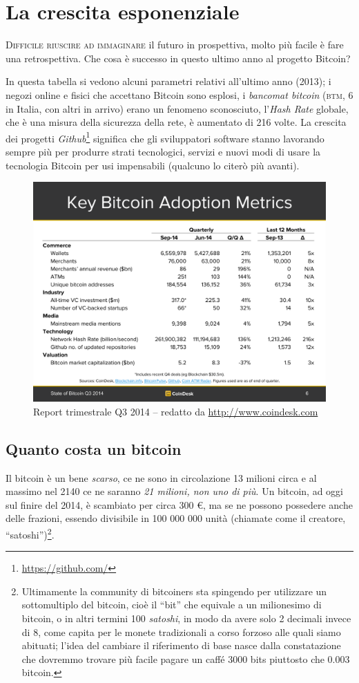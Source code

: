 \documentclass[a4paper,12pt,italian]{article}
\begin{document}
\section*{La crescita esponenziale}


\lettrine[lines=2]{D}{ifficile riuscire ad immaginare} il futuro in prospettiva, molto più
facile è fare una retrospettiva. Che cosa è successo in questo ultimo
anno al progetto Bitcoin?

In questa tabella 
si vedono alcuni parametri relativi all'ultimo anno (2013); i negozi online e fisici
che accettano Bitcoin sono esplosi, i \emph{bancomat bitcoin} (\textsc{btm}, 6 in
Italia, con altri in arrivo) erano un fenomeno sconosciuto, l’\emph{Hash Rate}
globale, che è una misura della sicurezza della rete, è aumentato di
216 volte. La crescita dei progetti \emph{Github}\footnote{\url{https://github.com/}}
significa che gli sviluppatori software stanno lavorando sempre più per
produrre strati tecnologici, servizi e nuovi modi di usare la
tecnologia Bitcoin per usi impensabili (qualcuno lo citerò più
avanti).

\begin{figure}
\centering
\includegraphics[width=.8\linewidth]{figures/metrics.pdf}
\caption{Report trimestrale Q3 2014 -- redatto da \url{http://www.coindesk.com}}
\end{figure}



\subsection*{Quanto costa un bitcoin}


Il bitcoin è un bene \emph{scarso}, ce ne sono in circolazione 13 milioni circa
e al massimo nel 2140 ce ne saranno \emph{21 milioni, non uno di più}. Un
bitcoin, ad oggi sul finire del 2014, è scambiato per circa 300 €, ma se ne possono
possedere anche delle frazioni, essendo divisibile in 100 000 000 
unità (chiamate come il creatore, “satoshi”)\footnote{Ultimamente
la community di bitcoiners sta spingendo per utilizzare un
sottomultiplo del bitcoin, cioè il “bit” che equivale a un milionesimo
di bitcoin, o in altri termini 100 \emph{satoshi}, in modo da avere solo 2
decimali invece di 8, come capita per le monete tradizionali a corso
forzoso alle quali siamo abituati; l’idea del cambiare il riferimento
di base nasce dalla constatazione che dovremmo trovare più facile 
pagare un caffé 3000 bits piuttosto che 0.003 bitcoin. 
}.
\end{document}
